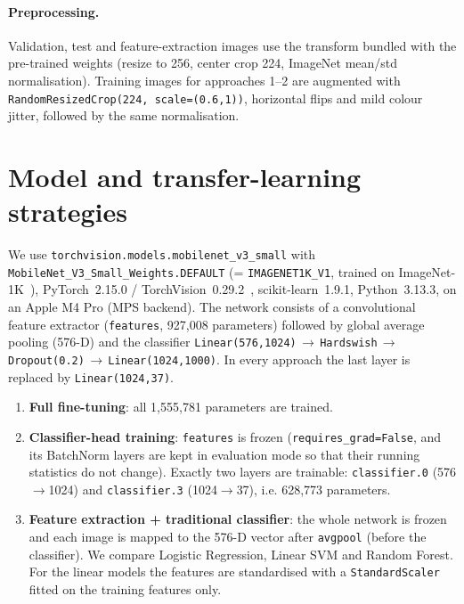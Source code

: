 \documentclass[11pt,a4paper]{article}
\begin{document}
\paragraph{Preprocessing.} Validation, test and feature-extraction images use the
transform bundled with the pre-trained weights (resize to 256, center crop 224, ImageNet
mean/std normalisation). Training images for approaches 1--2 are augmented with
\texttt{RandomResizedCrop(224, scale=(0.6,1))}, horizontal flips and mild colour jitter,
followed by the same normalisation.

\section{Model and transfer-learning strategies}
We use \texttt{torchvision.models.mobilenet\_v3\_small} with
\texttt{MobileNet\_V3\_Small\_Weights.DEFAULT} (= \texttt{IMAGENET1K\_V1}, trained on
ImageNet-1K~\cite{imagenet}), PyTorch~2.15.0 / TorchVision~0.29.2~\cite{pytorch},
scikit-learn~1.9.1, Python~3.13.3, on an Apple M4 Pro (MPS backend). The network consists of
a convolutional feature extractor (\texttt{features}, 927{,}008 parameters) followed by global
average pooling (576-D) and the classifier
\texttt{Linear(576,1024)}\,$\to$\,\texttt{Hardswish}\,$\to$\,\texttt{Dropout(0.2)}\,$\to$\,\texttt{Linear(1024,1000)}.
In every approach the last layer is replaced by \texttt{Linear(1024,37)}.

\begin{enumerate}
\item \textbf{Full fine-tuning}: all 1{,}555{,}781 parameters are trained.
\item \textbf{Classifier-head training}: \texttt{features} is frozen
(\texttt{requires\_grad=False}, and its BatchNorm layers are kept in evaluation mode so that
their running statistics do not change). Exactly two layers are trainable:
\texttt{classifier.0} (576$\to$1024) and \texttt{classifier.3} (1024$\to$37), i.e.
628{,}773 parameters.
\item \textbf{Feature extraction + traditional classifier}: the whole network is frozen and
each image is mapped to the 576-D vector after \texttt{avgpool} (before the classifier).
We compare Logistic Regression, Linear SVM and Random Forest. For the linear models the
features are standardised with a \texttt{StandardScaler} fitted on the training features only.
\end{enumerate}
\end{document}
